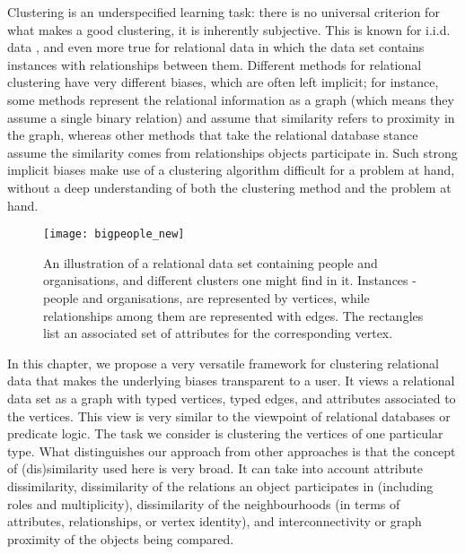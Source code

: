 Clustering is an underspecified learning task: there is no universal criterion for what makes a good clustering, it is inherently subjective.  
This is known for i.i.d. data \cite{Estivill-Castro:2002}, and even more true for relational data in which the data set contains instances with relationships between them.  
Different methods for relational clustering have very different biases, which are often left implicit; for instance, some methods represent the relational information as a graph (which means they assume a single binary relation) and assume that similarity refers to proximity in the graph, whereas other methods that take the relational database stance assume the similarity comes from relationships objects participate in.
Such strong implicit biases make use of a clustering algorithm difficult for a problem at hand, without a deep understanding of both the clustering method and the problem at hand.

\begin{figure}
  \centering
  \medskip
  \texttt{[image: bigpeople\_new]}
  \caption{An illustration of a relational data set containing people and organisations, and different clusters one might find in it. Instances - people and organisations, are represented by vertices, while relationships among them are represented with edges. The rectangles list an associated set of attributes for the corresponding vertex.}
  \label{fig:clustering:intro}
\end{figure}


In this chapter, we propose a very versatile framework for clustering relational data that makes the underlying biases transparent to a user.  
It views a relational data set as a graph with typed vertices, typed edges, and attributes associated to the vertices.  
This view is very similar to the viewpoint of relational databases or predicate logic.  
The task we consider is clustering the vertices of one particular type. 
What distinguishes our approach from other approaches is that the concept of (dis)similarity used here is very broad.  
It can take into account attribute dissimilarity, dissimilarity of the relations an object participates in (including roles and multiplicity), dissimilarity of the neighbourhoods (in terms of attributes, relationships, or vertex identity), and interconnectivity or graph proximity of the objects being compared. 



